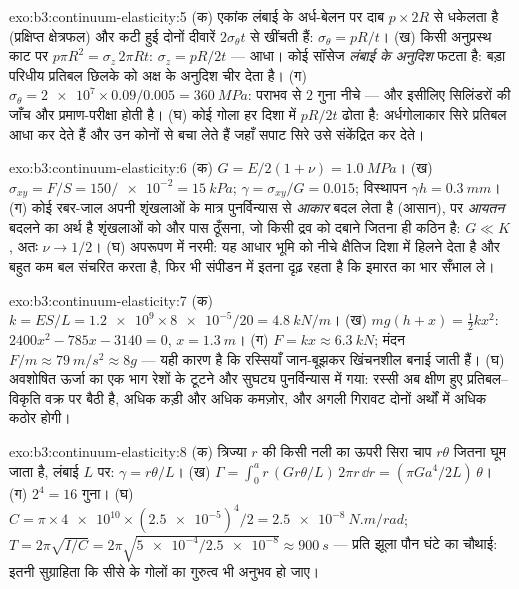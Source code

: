 \begin{solution}{exo:b3:continuum-elasticity:5}
(क) एकांक लंबाई के अर्ध-बेलन पर दाब $p
\times 2R$ से धकेलता है (प्रक्षिप्त क्षेत्रफल) और कटी हुई दोनों दीवारें
$2\sigma_\theta t$ से खींचती हैं: $\sigma_\theta = pR/t$। (ख) किसी
अनुप्रस्थ काट पर $p\pi R^2 = \sigma_z\,2\pi Rt$: $\sigma_z = pR/2t$ ---
आधा। कोई सॉसेज \emph{लंबाई के अनुदिश} फटता है: बड़ा परिधीय प्रतिबल
छिलके को अक्ष के अनुदिश चीर देता है। (ग) $\sigma_\theta = \num{2e7} \times
0.09/0.005 = \qty{360}{MPa}$: पराभव से $2$ गुना नीचे --- और इसीलिए
सिलिंडरों की जाँच और प्रमाण-परीक्षा होती है। (घ) कोई गोला हर दिशा में
$pR/2t$ ढोता है: अर्धगोलाकार सिरे प्रतिबल आधा कर देते हैं और उन कोनों
से बचा लेते हैं जहाँ सपाट सिरे उसे संकेंद्रित कर देते।
\end{solution}

\begin{solution}{exo:b3:continuum-elasticity:6}
(क) $G = E/2(1 + \nu) = \qty{1.0}{MPa}$। (ख) $\sigma_{xy} = F/S =
150/\num{e-2} = \qty{15}{kPa}$; $\gamma = \sigma_{xy}/G = 0.015$;
विस्थापन $\gamma h = \qty{0.3}{mm}$। (ग) कोई रबर-जाल अपनी शृंखलाओं के
मात्र पुनर्विन्यास से \emph{आकार} बदल लेता है (आसान), पर
\emph{आयतन} बदलने का अर्थ है शृंखलाओं को और पास ठूँसना, जो किसी द्रव को
दबाने जितना ही कठिन है: $G \ll K$, अतः $\nu \to 1/2$। (घ) अपरूपण में
नरमी: यह आधार भूमि को नीचे क्षैतिज दिशा में हिलने देता है और बहुत कम
बल संचरित करता है, फिर भी संपीडन में इतना दृढ़ रहता है कि इमारत का भार
सँभाल ले।
\end{solution}

\begin{solution}{exo:b3:continuum-elasticity:7}
(क) $k = ES/L = \num{1.2e9} \times \num{8e-5}/20 = \qty{4.8}{kN/m}$।
(ख) $mg(h + x) = \tfrac12 kx^2$: $2400x^2 - 785x - 3140 = 0$, $x =
\qty{1.3}{m}$। (ग) $F = kx \approx \qty{6.3}{kN}$; मंदन $F/m
\approx \qty{79}{m/s^2} \approx 8g$ --- यही कारण है कि रस्सियाँ
जान-बूझकर खिंचनशील बनाई जाती हैं। (घ) अवशोषित ऊर्जा का एक भाग
रेशों के टूटने और सुघट्य पुनर्विन्यास में गया: रस्सी अब क्षीण हुए
प्रतिबल--विकृति वक्र पर बैठी है, अधिक कड़ी और अधिक कमज़ोर, और अगली
गिरावट दोनों अर्थों में अधिक कठोर होगी।
\end{solution}

\begin{solution}{exo:b3:continuum-elasticity:8}
(क) त्रिज्या $r$ की किसी नली का ऊपरी सिरा चाप $r\theta$ जितना घूम
जाता है, लंबाई $L$ पर: $\gamma = r\theta/L$। (ख) $\Gamma = \int_0^a r\,(G r\theta/L)\,
2\pi r\,\dd r = (\pi Ga^4/2L)\,\theta$। (ग) $2^4 = 16$ गुना। (घ) $C =
\pi \times \num{4e10} \times (\num{2.5e-5})^4/2 =
\qty{2.5e-8}{N.m/rad}$; $T = 2\pi\sqrt{I/C} = 2\pi\sqrt{\num{5e-4}/
\num{2.5e-8}} \approx \qty{900}{s}$ --- प्रति झूला पौन घंटे का चौथाई:
इतनी सुग्राहिता कि सीसे के गोलों का गुरुत्व भी अनुभव हो जाए।
\end{solution}

